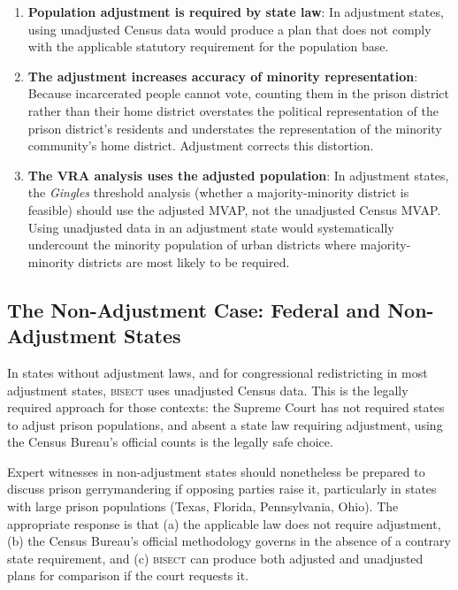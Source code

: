 \begin{enumerate}
\item \textbf{Population adjustment is required by state law}: In
adjustment states, using unadjusted Census data would produce a plan
that does not comply with the applicable statutory requirement for
the population base.

\item \textbf{The adjustment increases accuracy of minority representation}:
Because incarcerated people cannot vote, counting them in the prison
district rather than their home district overstates the political representation
of the prison district's residents and understates the representation of
the minority community's home district. Adjustment corrects this distortion.

\item \textbf{The VRA analysis uses the adjusted population}: In adjustment
states, the \textit{Gingles} threshold analysis (whether a majority-minority
district is feasible) should use the adjusted MVAP, not the unadjusted
Census MVAP. Using unadjusted data in an adjustment state would systematically
undercount the minority population of urban districts where majority-minority
districts are most likely to be required.
\end{enumerate}

\subsection{The Non-Adjustment Case: Federal and Non-Adjustment States}

In states without adjustment laws, and for congressional redistricting in
most adjustment states, \textsc{bisect} uses unadjusted Census data.
This is the legally required approach for those contexts: the Supreme Court
has not required states to adjust prison populations, and absent a state
law requiring adjustment, using the Census Bureau's official counts is the
legally safe choice.

Expert witnesses in non-adjustment states should nonetheless be prepared to
discuss prison gerrymandering if opposing parties raise it, particularly in
states with large prison populations (Texas, Florida, Pennsylvania, Ohio).
The appropriate response is that (a) the applicable law does not require
adjustment, (b) the Census Bureau's official methodology governs in the
absence of a contrary state requirement, and (c) \textsc{bisect} can produce
both adjusted and unadjusted plans for comparison if the court requests it.

